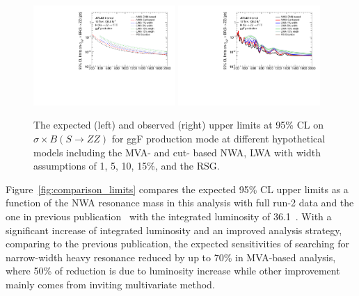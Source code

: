 \begin{figure}[h]
    \centering
    \includegraphics[width=0.48\textwidth]{figures/HMHZZ/results/4l_compareAll_exp.pdf}
    \includegraphics[width=0.48\textwidth]{figures/HMHZZ/results/4l_compareAll_obs.pdf}
    \caption{The expected (left) and observed (right) upper limits at 95\% CL on $\sigma \times B(S\to ZZ)$ for ggF production mode at different hypothetical models including the MVA- and cut- based NWA, LWA with width assumptions of 1, 5, 10, 15\%, and the RSG. }
    \label{fig:models_limits}
\end{figure}

Figure~\ref{fig:comparison_limits} compares the expected 95\% CL upper limits as a function of the NWA resonance mass 
in this analysis with full run-2 data and the one in previous publication~\cite{Aaboud:2017rel} with the integrated luminosity of 36.1~\ifb.
With a significant increase of integrated luminosity and an improved analysis strategy, comparing to the previous publication,
the expected sensitivities of searching for narrow-width heavy resonance reduced by up to 70\% in MVA-based analysis,
where 50\% of reduction is due to luminosity increase while other improvement mainly comes from inviting multivariate method.

